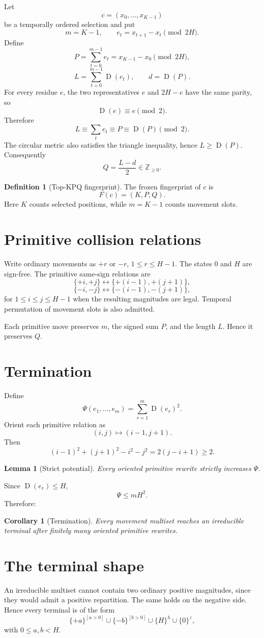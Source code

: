 \documentclass[11pt]{article}
\newtheorem{lemma}[theorem]{Lemma}
\newtheorem{corollary}[theorem]{Corollary}
\theoremstyle{definition}
\newtheorem{definition}[theorem]{Definition}
\newcommand{\Z}{\mathbb{Z}}
\newcommand{\D}{\operatorname{D}}
\newcommand{\1}{\mathbf{1}}
\begin{document}
Let
\[
c=(x_0,\ldots,x_{K-1})
\]
be a temporally ordered selection and put
\[
m=K-1,\qquad e_t=x_{t+1}-x_t\pmod{2H}.
\]
Define
\[
P=\sum_{t=0}^{m-1}e_t=x_{K-1}-x_0\pmod{2H},
\]
\[
L=\sum_{t=0}^{m-1}\D(e_t),\qquad d=\D(P).
\]
For every residue $e$, the two representatives $e$ and $2H-e$ have the same parity, so
\[
\D(e)\equiv e\pmod2.
\]
Therefore
\[
L\equiv\sum_t e_t\equiv P\equiv\D(P)\pmod2.
\]
The circular metric also satisfies the triangle inequality, hence $L\ge\D(P)$. Consequently
\[
Q=\frac{L-d}{2}\in\Z_{\ge0}.
\]

\begin{definition}[Top-KPQ fingerprint]
The frozen fingerprint of $c$ is
\[
F(c)=(K,P,Q).
\]
Here $K$ counts selected positions, while $m=K-1$ counts movement slots.
\end{definition}

\section{Primitive collision relations}
Write ordinary movements as $+r$ or $-r$, $1\le r\le H-1$. The states $0$ and $H$ are sign-free. The primitive same-sign relations are
\[
\{+i,+j\}\leftrightarrow\{+(i-1),+(j+1)\},
\]
\[
\{-i,-j\}\leftrightarrow\{-(i-1),-(j+1)\},
\]
for $1\le i\le j\le H-1$ when the resulting magnitudes are legal. Temporal permutation of movement slots is also admitted.

Each primitive move preserves $m$, the signed sum $P$, and the length $L$. Hence it preserves $Q$.

\section{Termination}
Define
\[
\Psi(e_1,\ldots,e_m)=\sum_{r=1}^m \D(e_r)^2.
\]
Orient each primitive relation as
\[
(i,j)\longmapsto(i-1,j+1).
\]
Then
\[
(i-1)^2+(j+1)^2-i^2-j^2=2(j-i+1)\ge2.
\]

\begin{lemma}[Strict potential]
Every oriented primitive rewrite strictly increases $\Psi$.
\end{lemma}

Since $\D(e_r)\le H$,
\[
\Psi\le mH^2.
\]
Therefore:

\begin{corollary}[Termination]
Every movement multiset reaches an irreducible terminal after finitely many oriented primitive rewrites.
\end{corollary}

\section{The terminal shape}
An irreducible multiset cannot contain two ordinary positive magnitudes, since they would admit a positive repartition. The same holds on the negative side. Hence every terminal is of the form
\[
\{+a\}^{[a>0]}\cup\{-b\}^{[b>0]}\cup\{H\}^h\cup\{0\}^z,
\]
with $0\le a,b<H$.
\end{document}
